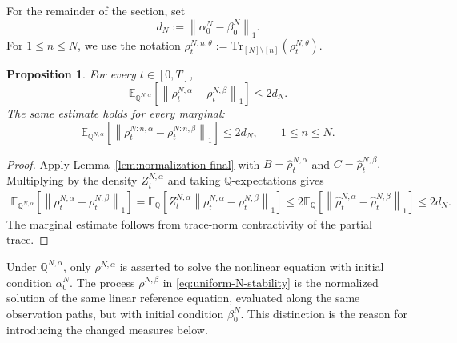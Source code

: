 \documentclass[10pt,a4paper,reqno]{amsart}
\numberwithin{equation}{section}
\theoremstyle{plain}
\newtheorem{proposition}[theorem]{Proposition}
\theoremstyle{definition}
\theoremstyle{remark}
\newcommand{\Tr}{\mathrm{Tr}}
\newcommand{\E}{\mathbb E}
\newcommand{\Q}{\mathbb Q}
\newcommand{\1}{\mathbf 1}
\begin{document}
For the remainder of the section, set
\begin{equation}
  d_N
  :=
  \left\|
    \alpha_0^N-\beta_0^N
  \right\|_1.
  \label{eq:perturbation-dN}
\end{equation}
For $1\le n\le N$, we use the notation
\(
  \rho_t^{N:n,\theta}
  :=
  \Tr_{[N]\setminus[n]}(\rho_t^{N,\theta}).
\)

\begin{proposition}
\label{prop:common-reference-final}
For every \(t\in[0,T]\),
\begin{equation}
  \E_{\Q^{N,\alpha}}
  \left[
    \left\|
      \rho_t^{N,\alpha}
      -
      \rho_t^{N,\beta}
    \right\|_1
  \right]
  \le
  2d_N.
  \label{eq:uniform-N-stability}
\end{equation}
The same estimate holds for every marginal:
\begin{equation}
  \E_{\Q^{N,\alpha}}
  \left[
    \left\|
      \rho_t^{N:n,\alpha}
      -
      \rho_t^{N:n,\beta}
    \right\|_1
  \right]
  \le
  2d_N,
  \qquad
  1\le n\le N.
  \label{eq:uniform-marginal-stability}
\end{equation}
\end{proposition}

\begin{proof}
Apply Lemma~\ref{lem:normalization-final} with
\(
  B=\widehat\rho_t^{N,\alpha}\) and \(
  C=\widehat\rho_t^{N,\beta}.
\)
Multiplying by the density \(Z_t^{N,\alpha}\) and taking
\(\Q\)-expectations gives
\[
\begin{aligned}
  \E_{\Q^{N,\alpha}}
  \left[
    \left\|
      \rho_t^{N,\alpha}
      -
      \rho_t^{N,\beta}
    \right\|_1
  \right]
  =
  \E_{\Q}
  \left[
    Z_t^{N,\alpha}
    \left\|
      \rho_t^{N,\alpha}
      -
      \rho_t^{N,\beta}
    \right\|_1
  \right]
  \le
  2
  \E_{\Q}
  \left[
    \left\|
      \widehat\rho_t^{N,\alpha}
      -
      \widehat\rho_t^{N,\beta}
    \right\|_1
  \right]
  \le
  2d_N.
\end{aligned}
\]
The marginal estimate follows from trace-norm contractivity of the partial
trace.
\end{proof}

Under \(\Q^{N,\alpha}\), only \(\rho^{N,\alpha}\) is asserted to solve the
nonlinear equation with initial condition \(\alpha_0^N\).  The process
\(\rho^{N,\beta}\) in
\eqref{eq:uniform-N-stability} is the normalized solution of the same
linear reference equation, evaluated along the same observation paths, but
with initial condition \(\beta_0^N\).  This distinction is the reason for
introducing the changed measures below.
\end{document}

